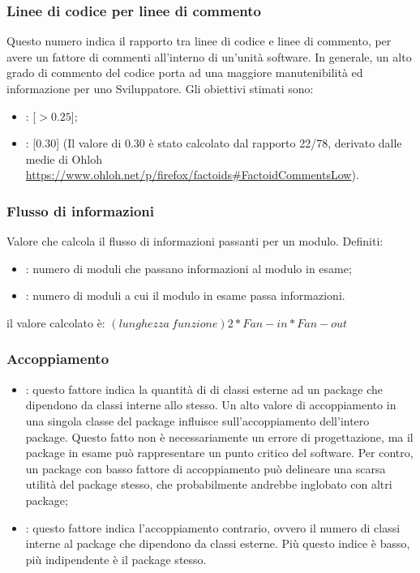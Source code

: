 \subsubsection{Linee di codice per linee di commento}
\label{4.2.5}
Questo numero indica il rapporto tra linee di codice e linee di commento, per avere un fattore di commenti all'interno di un'unità software. In generale, un alto grado di commento del codice porta ad una maggiore manutenibilità ed informazione per uno Sviluppatore.
Gli obiettivi stimati sono:
\begin{itemize}
\item {}: [$>0.25$];
\item {}: [0.30] (Il valore di 0.30 è stato calcolato dal rapporto 22/78, derivato dalle medie di Ohloh \url{https://www.ohloh.net/p/firefox/factoids#FactoidCommentsLow}).
\end{itemize}

\subsubsection{Flusso di informazioni}
\label{4.2.6}
Valore che calcola il flusso di informazioni passanti per un modulo.
Definiti:
\begin{itemize}
\item {}: numero di moduli che passano informazioni al modulo in esame;
\item {}: numero di moduli a cui il modulo in esame passa informazioni.
\end{itemize}
il valore calcolato è:
\begin{math}(lunghezza\:funzione)2 * Fan-in * Fan-out\end{math}

\subsubsection{Accoppiamento}
\label{4.2.7}
\begin{itemize}
\item {}: questo fattore indica la quantità di di classi esterne ad un package che dipendono da classi interne allo stesso.
Un alto valore di accoppiamento in una singola classe del package influisce sull'accoppiamento dell'intero package. Questo fatto non è necessariamente un errore di progettazione, ma il package in esame può rappresentare un punto critico del software. Per contro, un package con basso fattore di accoppiamento può delineare una scarsa utilità del package stesso, che probabilmente andrebbe inglobato con altri package;
\item {}: questo fattore indica l'accoppiamento contrario, ovvero il numero di classi interne al package che dipendono da classi esterne. Più questo indice è basso, più indipendente è il package stesso.
\end{itemize}

